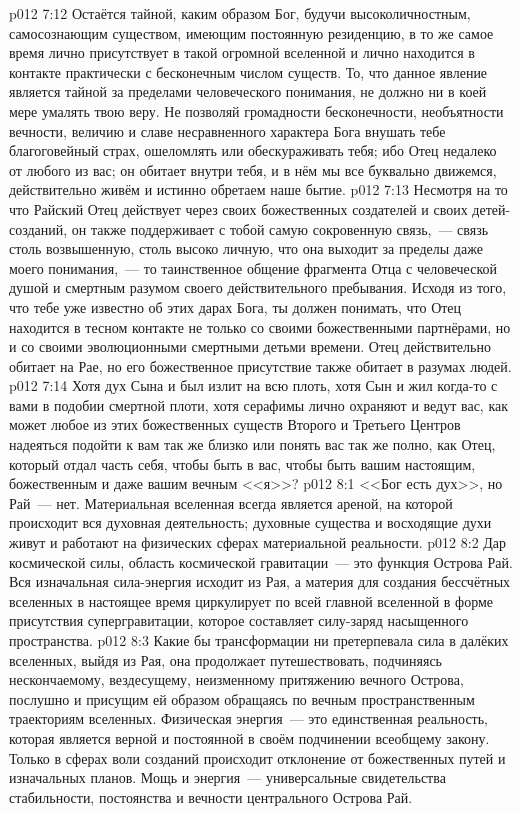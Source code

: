 \vs p012 7:12 \pc Остаётся тайной, каким образом Бог, будучи высоколичностным, самосознающим существом, имеющим постоянную резиденцию, в то же самое время лично присутствует в такой огромной вселенной и лично находится в контакте практически с бесконечным числом существ. То, что данное явление является тайной за пределами человеческого понимания, не должно ни в коей мере умалять твою веру. Не позволяй громадности бесконечности, необъятности вечности, величию и славе несравненного характера Бога внушать тебе благоговейный страх, ошеломлять или обескураживать тебя; ибо Отец недалеко от любого из вас; он обитает внутри тебя, и в нём мы все буквально движемся, действительно живём и истинно обретаем наше бытие.
\vs p012 7:13 \pc Несмотря на то что Райский Отец действует через своих божественных создателей и своих детей\hyp{}созданий, он также поддерживает с тобой самую сокровенную связь,~--- связь столь возвышенную, столь высоко личную, что она выходит за пределы даже моего понимания,~--- то таинственное общение фрагмента Отца с человеческой душой и смертным разумом своего действительного пребывания. Исходя из того, что тебе уже известно об этих дарах Бога, ты должен понимать, что Отец находится в тесном контакте не только со своими божественными партнёрами, но и со своими эволюционными смертными детьми времени. Отец действительно обитает на Рае, но его божественное присутствие также обитает в разумах людей.
\vs p012 7:14 Хотя дух Сына и был излит на всю плоть, хотя Сын и жил когда\hyp{}то с вами в подобии смертной плоти, хотя серафимы лично охраняют и ведут вас, как может любое из этих божественных существ Второго и Третьего Центров надеяться подойти к вам так же близко или понять вас так же полно, как Отец, который отдал часть себя, чтобы быть в вас, чтобы быть вашим настоящим, божественным и даже вашим вечным <<я>>?
\vs p012 8:1 <<Бог есть дух>>, но Рай~--- нет. Материальная вселенная всегда является ареной, на которой происходит вся духовная деятельность; духовные существа и восходящие духи живут и работают на физических сферах материальной реальности.
\vs p012 8:2 \pc Дар космической силы, область космической гравитации~--- это функция Острова Рай. Вся изначальная сила\hyp{}энергия исходит из Рая, а материя для создания бессчётных вселенных в настоящее время циркулирует по всей главной вселенной в форме присутствия супергравитации, которое составляет силу\hyp{}заряд насыщенного пространства.
\vs p012 8:3 Какие бы трансформации ни претерпевала сила в далёких вселенных, выйдя из Рая, она продолжает путешествовать, подчиняясь нескончаемому, вездесущему, неизменному притяжению вечного Острова, послушно и присущим ей образом обращаясь по вечным пространственным траекториям вселенных. Физическая энергия~--- это единственная реальность, которая является верной и постоянной в своём подчинении всеобщему закону. Только в сферах воли созданий происходит отклонение от божественных путей и изначальных планов. Мощь и энергия~--- универсальные свидетельства стабильности, постоянства и вечности центрального Острова Рай.
